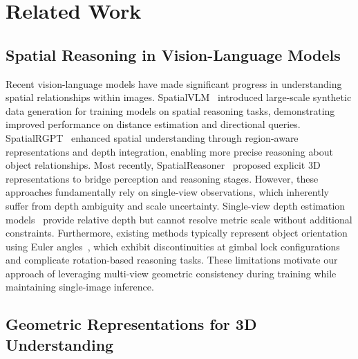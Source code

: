 \section{Related Work}
\label{sec:related}

\subsection{Spatial Reasoning in Vision-Language Models}

Recent vision-language models have made significant progress in understanding spatial relationships within images. SpatialVLM~\cite{chen2024spatialvlm} introduced large-scale synthetic data generation for training models on spatial reasoning tasks, demonstrating improved performance on distance estimation and directional queries. SpatialRGPT~\cite{cheng2024spatialrgpt} enhanced spatial understanding through region-aware representations and depth integration, enabling more precise reasoning about object relationships. Most recently, SpatialReasoner~\cite{ma2025spatialreasoner} proposed explicit 3D representations to bridge perception and reasoning stages. However, these approaches fundamentally rely on single-view observations, which inherently suffer from depth ambiguity and scale uncertainty. Single-view depth estimation models~\cite{yang2024depth} provide relative depth but cannot resolve metric scale without additional constraints. Furthermore, existing methods typically represent object orientation using Euler angles~\cite{chen2024spatialvlm,ma2025spatialreasoner}, which exhibit discontinuities at gimbal lock configurations and complicate rotation-based reasoning tasks. These limitations motivate our approach of leveraging multi-view geometric consistency during training while maintaining single-image inference.

\subsection{Geometric Representations for 3D Understanding}

